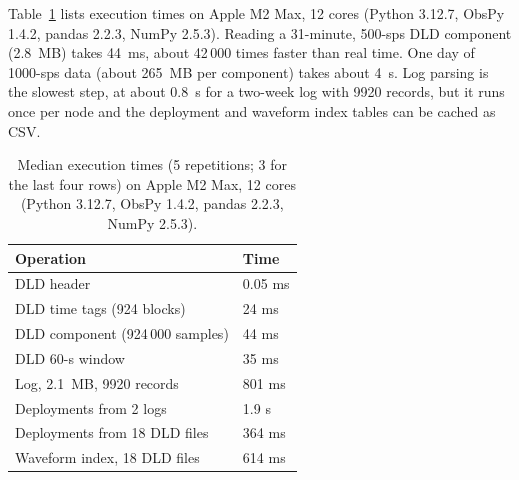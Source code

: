 Table~\ref{tab:perf} lists execution times on Apple M2 Max, 12 cores (Python 3.12.7, ObsPy 1.4.2, pandas 2.2.3, NumPy 2.5.3). Reading a 31-minute, 500-sps DLD component (2.8~MB) takes 44~ms, about 42\,000 times faster than real time. One day of 1000-sps data (about 265~MB per component) takes about 4~s. Log parsing is the slowest step, at about 0.8~s for a two-week log with 9920 records, but it runs once per node and the deployment and waveform index tables can be cached as CSV.

\begin{table}[ht!]
\seismicatablestyle
\begin{tabular}{m{4.9cm} m{2.4cm}}
Operation & Time \\
\hline
DLD header & 0.05 ms \\
DLD time tags (924 blocks) & 24 ms \\
DLD component (924\,000 samples) & 44 ms \\
DLD 60-s window & 35 ms \\
Log, 2.1~MB, 9920 records & 801 ms \\
Deployments from 2 logs & 1.9 s \\
Deployments from 18 DLD files & 364 ms \\
Waveform index, 18 DLD files & 614 ms \\
\end{tabular}
\caption{Median execution times (5 repetitions; 3 for the last four rows) on Apple M2 Max, 12 cores (Python 3.12.7, ObsPy 1.4.2, pandas 2.2.3, NumPy 2.5.3).}
\label{tab:perf}
\end{table}
